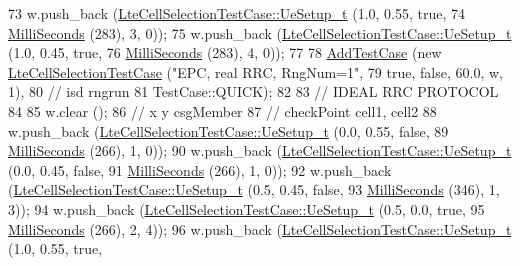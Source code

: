 \begin{DoxyCode}
73   w.push\_back (\hyperlink{structLteCellSelectionTestCase_1_1UeSetup__t}{LteCellSelectionTestCase::UeSetup\_t} (1.0, 0.55, \textcolor{keyword}{true},
74                                                     \hyperlink{group__timecivil_gaf26127cf4571146b83a92ee18679c7a9}{MilliSeconds} (283), 3, 0));
75   w.push\_back (\hyperlink{structLteCellSelectionTestCase_1_1UeSetup__t}{LteCellSelectionTestCase::UeSetup\_t} (1.0, 0.45, \textcolor{keyword}{true},
76                                                     \hyperlink{group__timecivil_gaf26127cf4571146b83a92ee18679c7a9}{MilliSeconds} (283), 4, 0));
77 
78   \hyperlink{classns3_1_1TestCase_a3718088e3eefd5d6454569d2e0ddd835}{AddTestCase} (\textcolor{keyword}{new} \hyperlink{classLteCellSelectionTestCase}{LteCellSelectionTestCase} (\textcolor{stringliteral}{"EPC, real RRC, RngNum=1"},
79                                              \textcolor{keyword}{true}, \textcolor{keyword}{false}, 60.0, w, 1),
80                \textcolor{comment}{//                                        isd       rngrun}
81                TestCase::QUICK);
82 
83   \textcolor{comment}{// IDEAL RRC PROTOCOL}
84 
85   w.clear ();
86   \textcolor{comment}{//                                                x     y    csgMember}
87   \textcolor{comment}{//                                                checkPoint     cell1, cell2}
88   w.push\_back (\hyperlink{structLteCellSelectionTestCase_1_1UeSetup__t}{LteCellSelectionTestCase::UeSetup\_t} (0.0, 0.55, \textcolor{keyword}{false},
89                                                     \hyperlink{group__timecivil_gaf26127cf4571146b83a92ee18679c7a9}{MilliSeconds} (266), 1, 0));
90   w.push\_back (\hyperlink{structLteCellSelectionTestCase_1_1UeSetup__t}{LteCellSelectionTestCase::UeSetup\_t} (0.0, 0.45, \textcolor{keyword}{false},
91                                                     \hyperlink{group__timecivil_gaf26127cf4571146b83a92ee18679c7a9}{MilliSeconds} (266), 1, 0));
92   w.push\_back (\hyperlink{structLteCellSelectionTestCase_1_1UeSetup__t}{LteCellSelectionTestCase::UeSetup\_t} (0.5, 0.45, \textcolor{keyword}{false},
93                                                     \hyperlink{group__timecivil_gaf26127cf4571146b83a92ee18679c7a9}{MilliSeconds} (346), 1, 3));
94   w.push\_back (\hyperlink{structLteCellSelectionTestCase_1_1UeSetup__t}{LteCellSelectionTestCase::UeSetup\_t} (0.5, 0.0,  \textcolor{keyword}{true},
95                                                     \hyperlink{group__timecivil_gaf26127cf4571146b83a92ee18679c7a9}{MilliSeconds} (266), 2, 4));
96   w.push\_back (\hyperlink{structLteCellSelectionTestCase_1_1UeSetup__t}{LteCellSelectionTestCase::UeSetup\_t} (1.0, 0.55, \textcolor{keyword}{true},

\end{DoxyCode}
